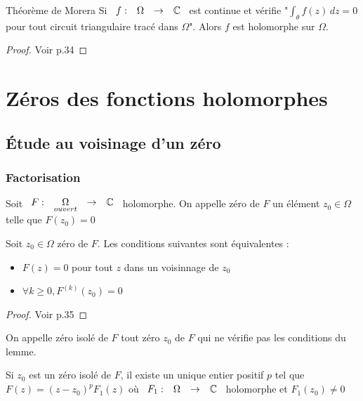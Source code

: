 \documentclass[]{report}
\begin{document}
\begin{tm}{Théorème de Morera}{}
    Si $\begin{array}{ccccc} f : & \Omega & \to & \mathbb{C} \end{array}$ est continue et vérifie "$\int_\theta f(z)\,dz=0$ pour tout circuit triangulaire tracé dans $\Omega$". Alors $f$ est holomorphe sur $\Omega$.
\end{tm}

\begin{proof}{}{}
    Voir p.34
\end{proof}

\chapter{Zéros des fonctions holomorphes}

\section{Étude au voisinage d'un zéro}

\subsection{Factorisation}

Soit $\begin{array}{ccccc} F : & \underset{ouvert}{\Omega} & \to & \mathbb{C} \end{array}$ holomorphe. On appelle zéro de $F$ un élément $z_0\in\Omega$ telle que $F(z_0)=0$

\begin{lm}{}{}
    Soit $z_0\in\Omega$ zéro de $F$. Les conditions suivantes sont équivalentes :\\
    \begin{itemize}
        \item $F(z)=0$ pour tout $z$ dans un voisinnage de $z_0$
        \item $\forall k\ge 0,F^{(k)}(z_0)=0$
    \end{itemize}
\end{lm}

\begin{proof}{}{}
    Voir p.35
\end{proof}

\begin{df}{}{}
    On appelle zéro isolé de $F$ tout zéro $z_0$ de $F$ qui ne vérifie pas les conditions du lemme.
\end{df}

\begin{prop}{}{}
    Si $z_0$ est un zéro isolé de $F$, il existe un unique entier positif $p$ tel que $F(z)=(z-z_0)^pF_1(z)$ où $\begin{array}{ccccc} F_1 : & \Omega & \to & \mathbb{C} \end{array}$ holomorphe et $F_1(z_0)\neq 0$
\end{prop}
\end{document}
